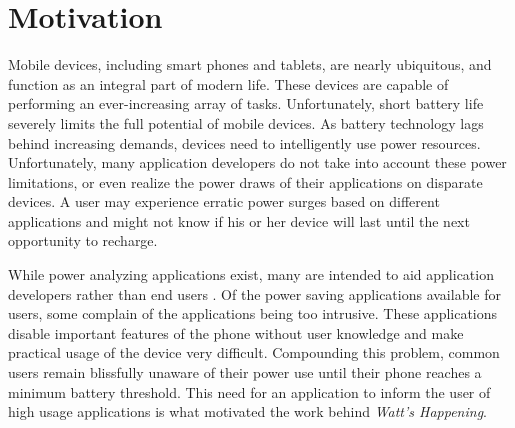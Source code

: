 \section*{Motivation}
\label{sec:motivation}
Mobile devices, including smart phones and tablets, are nearly ubiquitous, and function as an integral part of modern life. 
These devices are capable of performing an ever-increasing array of tasks. 
Unfortunately, short battery life severely limits the full potential of mobile devices. 
As battery technology lags behind increasing demands, devices need to intelligently use power resources. 
Unfortunately, many application developers do not take into account these power limitations, or even realize the power draws of their applications on disparate devices. 
A user may experience erratic power surges based on different applications and might not know if his or her device will last until the next opportunity to recharge. 

While power analyzing applications exist, many are intended to aid application developers rather than end users \cite{Pathak:2012:ESI:2168836.2168841} \cite{energy-aware}. 
Of the power saving applications available for users, some complain of the applications being too intrusive. 
These applications disable important features of the phone without user knowledge and make practical usage of the device very difficult. 
Compounding this problem, common users remain blissfully unaware of their power use until their phone reaches a minimum battery threshold.
This need for an application to inform the user of high usage applications is what motivated the work behind \emph{Watt's Happening}.
